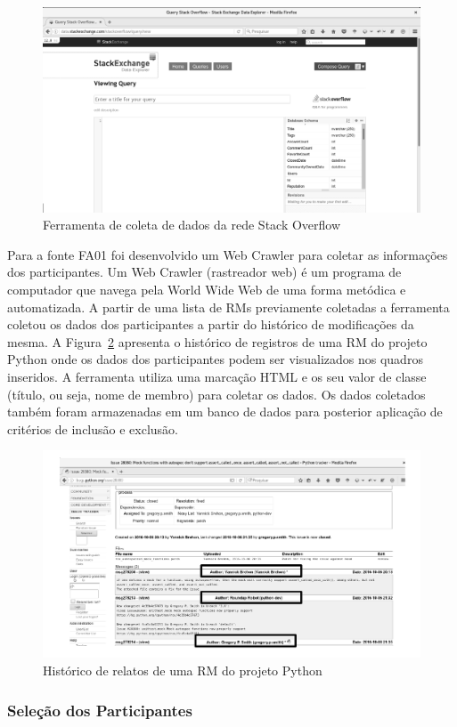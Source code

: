 \begin{figure}[htpb]
	\centering
	\includegraphics[width=0.8\linewidth]{./chapter-pesquisa-com-profissionais/img/stack-exchange.png}
	\caption{Ferramenta de coleta de dados da rede Stack Overflow}
\label{fig:stack-exchange}
\end{figure}

Para a fonte FA01 foi desenvolvido um Web Crawler para coletar as informações
dos participantes. Um Web Crawler (rastreador web) é um programa de computador
que navega pela World Wide Web de uma forma metódica e automatizada.  A partir
de uma lista de RMs previamente coletadas a ferramenta coletou os dados dos
participantes a partir do histórico de modificações da mesma. A
Figura~\ref{fig:historico-rm-python} apresenta o histórico de registros de uma
RM do projeto Python onde os dados dos participantes podem ser visualizados nos
quadros inseridos. A ferramenta utiliza uma marcação HTML e os seu valor de
classe (título, ou seja, nome de membro) para coletar os dados. Os dados
coletados também foram armazenadas em um banco de dados para posterior aplicação
de critérios de inclusão e exclusão.

\begin{figure}[htpb]
	\centering
	\includegraphics[width=0.6\linewidth]{./chapter-pesquisa-com-profissionais/img/historico-rm-python.pdf}
	\caption{Histórico de relatos de uma RM do projeto Python}
\label{fig:historico-rm-python}
\end{figure}

\subsubsection{Seleção dos Participantes}
\label{subsubsec:pesquisa_profissionais_plano_pesquisa}

